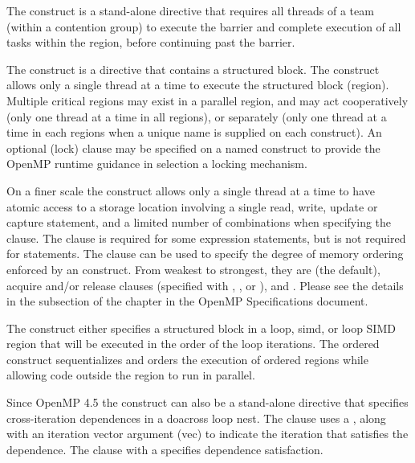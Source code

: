 \label{chap:synchronization}

The  construct is a stand-alone directive that requires all threads
of a team (within a contention group) to execute the barrier and complete
execution of all tasks within the region, before continuing past the barrier.

The  construct is a directive that contains a structured block. 
The construct allows only a single thread at a time to execute the structured block (region).
Multiple critical regions may exist in a parallel region, and may
act cooperatively (only one thread at a time in all  regions),
or separately (only one thread at a time in each  regions when
a unique name is supplied on each  construct).
An optional (lock)  clause may be specified on a named  
construct to provide the OpenMP runtime guidance in selection a locking 
mechanism.

On a finer scale the  construct allows only a single thread at 
a time to have atomic access to a storage location involving a single read, 
write, update or capture statement, and a limited number of combinations 
when specifying the   clause.  The
 clause is required for some expression statements, but is
not required for  statements. The  clause can be
used to specify the degree of memory ordering enforced by an 
construct. From weakest to strongest, they are  (the default),
acquire and/or release clauses (specified with , ,
or ), and .  Please see the details in the
 subsection of the  chapter in the OpenMP
Specifications document.

The  construct either specifies a structured block in a loop, 
simd, or loop SIMD region that will be executed in the order of the loop 
iterations.  The ordered construct sequentializes and orders the execution 
of ordered regions while allowing code outside the region to run in parallel.

Since OpenMP 4.5 the  construct can also be a stand-alone 
directive that specifies cross-iteration dependences in a doacross loop nest.  
The  clause uses a  , along with an 
iteration vector argument (vec) to indicate the iteration that satisfies the 
dependence.  The  clause with a 
 specifies dependence satisfaction.

